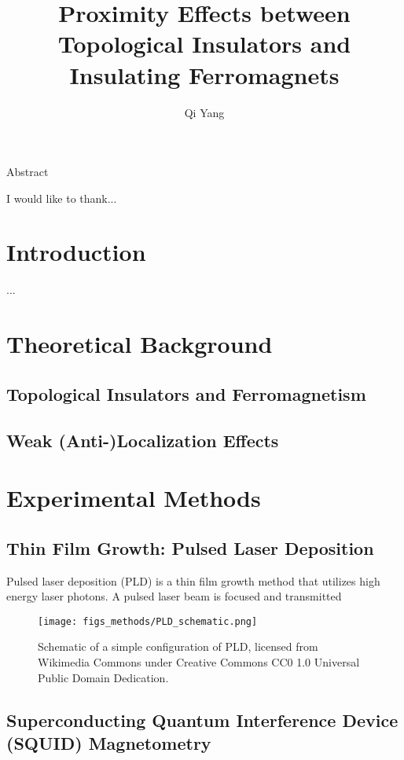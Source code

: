 \documentclass{report}
\begin{document}
\title{Proximity Effects between Topological Insulators and Insulating Ferromagnets}
\author{Qi Yang}

\beforepreface


    Abstract 


    I would like to thank...
\afterpreface

\captionsetup{width=0.95\columnwidth}%
\chapter{Introduction}
    ...

\chapter{Theoretical Background}
    \section{Topological Insulators and Ferromagnetism}
    \label{sec:TI-FM}
    \section{Weak (Anti-)Localization Effects}
    
\chapter{Experimental Methods}
    \section{Thin Film Growth: Pulsed Laser Deposition}
Pulsed laser deposition (PLD) is a thin film growth method that utilizes high energy laser photons. A pulsed laser beam is focused and transmitted 
\begin{figure}[ht]%
    \texttt{[image: figs\_methods/PLD\_schematic.png]}%
    \caption[A simple schematic of PLD]{\label{fig:PLD_schematic}Schematic of a simple configuration of PLD, licensed from Wikimedia Commons under Creative Commons CC0 1.0 Universal Public Domain Dedication.}%
\end{figure}%
 
    
    \section{Superconducting Quantum Interference Device (SQUID) Magnetometry}
\end{document}
